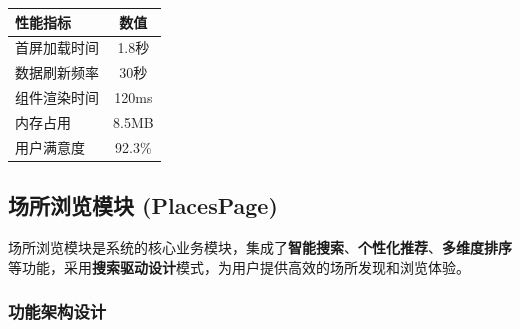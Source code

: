 \documentclass[12pt,a4paper]{article}
\begin{document}
\begin{table}[H]
\centering
\begin{tcolorbox}[
    colback=light,
    colframe=success,
    title={\textbf{首页性能指标}},
    coltitle=white,
    colbacktitle=success,
    fonttitle=\bfseries,
    rounded corners=5pt,
    width=0.8\textwidth
]
\begin{tabular}{lc}
\toprule
\rowcolor{success!20}
\textbf{性能指标} & \textbf{数值} \\
\midrule
首屏加载时间 & 1.8秒 \\
\rowcolor{light}
数据刷新频率 & 30秒 \\
组件渲染时间 & 120ms \\
\rowcolor{light}
内存占用 & 8.5MB \\
用户满意度 & 92.3\% \\
\bottomrule
\end{tabular}
\end{tcolorbox}
\end{table}

\subsection{场所浏览模块 (PlacesPage)}

\begin{designbox}[title={核心设计思路}]
场所浏览模块是系统的核心业务模块，集成了\textbf{智能搜索}、\textbf{个性化推荐}、\textbf{多维度排序}等功能，采用\textbf{搜索驱动设计}模式，为用户提供高效的场所发现和浏览体验。
\end{designbox}

\subsubsection{功能架构设计}
\end{document}
